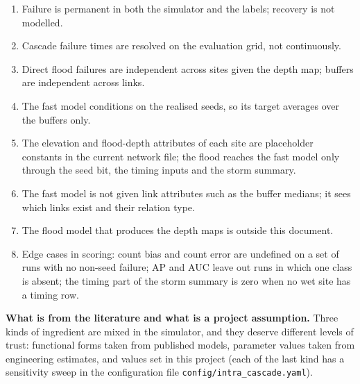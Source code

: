 \documentclass[11pt]{article}
\begin{document}
\begin{enumerate}
\item Failure is permanent in both the simulator and the labels; recovery is not modelled.
\item Cascade failure times are resolved on the evaluation grid, not continuously.
\item Direct flood failures are independent across sites given the depth map; buffers are independent across links.
\item The fast model conditions on the realised seeds, so its target averages over the buffers only.
\item The elevation and flood-depth attributes of each site are placeholder constants in the current network file; the flood reaches the fast model only through the seed bit, the timing inputs and the storm summary.
\item The fast model is not given link attributes such as the buffer medians; it sees which links exist and their relation type.
\item The flood model that produces the depth maps is outside this document.
\item Edge cases in scoring: count bias and count error are undefined on a set of runs with no non-seed failure; AP and AUC leave out runs in which one class is absent; the timing part of the storm summary is zero when no wet site has a timing row.
\end{enumerate}

\textbf{What is from the literature and what is a project assumption.} Three kinds of ingredient are mixed in the simulator, and they deserve different levels of trust: functional forms taken from published models, parameter values taken from engineering estimates, and values set in this project (each of the last kind has a sensitivity sweep in the configuration file \texttt{config/intra\_cascade.yaml}).
\end{document}
